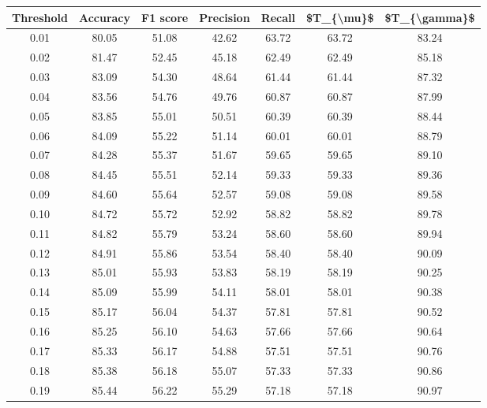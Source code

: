 \begin{tabular}{|c|c|c|c|c|c|c|}
\hline
 Threshold &  Accuracy &  F1 score &  Precision &  Recall &  \$T\_\{\textbackslash mu\}\$ &  \$T\_\{\textbackslash gamma\}\$ \\
\hline
      0.01 &     80.05 &     51.08 &      42.62 &   63.72 &      63.72 &         83.24 \\
      0.02 &     81.47 &     52.45 &      45.18 &   62.49 &      62.49 &         85.18 \\
      0.03 &     83.09 &     54.30 &      48.64 &   61.44 &      61.44 &         87.32 \\
      0.04 &     83.56 &     54.76 &      49.76 &   60.87 &      60.87 &         87.99 \\
      0.05 &     83.85 &     55.01 &      50.51 &   60.39 &      60.39 &         88.44 \\
      0.06 &     84.09 &     55.22 &      51.14 &   60.01 &      60.01 &         88.79 \\
      0.07 &     84.28 &     55.37 &      51.67 &   59.65 &      59.65 &         89.10 \\
      0.08 &     84.45 &     55.51 &      52.14 &   59.33 &      59.33 &         89.36 \\
      0.09 &     84.60 &     55.64 &      52.57 &   59.08 &      59.08 &         89.58 \\
      0.10 &     84.72 &     55.72 &      52.92 &   58.82 &      58.82 &         89.78 \\
      0.11 &     84.82 &     55.79 &      53.24 &   58.60 &      58.60 &         89.94 \\
      0.12 &     84.91 &     55.86 &      53.54 &   58.40 &      58.40 &         90.09 \\
      0.13 &     85.01 &     55.93 &      53.83 &   58.19 &      58.19 &         90.25 \\
      0.14 &     85.09 &     55.99 &      54.11 &   58.01 &      58.01 &         90.38 \\
      0.15 &     85.17 &     56.04 &      54.37 &   57.81 &      57.81 &         90.52 \\
      0.16 &     85.25 &     56.10 &      54.63 &   57.66 &      57.66 &         90.64 \\
      0.17 &     85.33 &     56.17 &      54.88 &   57.51 &      57.51 &         90.76 \\
      0.18 &     85.38 &     56.18 &      55.07 &   57.33 &      57.33 &         90.86 \\
      0.19 &     85.44 &     56.22 &      55.29 &   57.18 &      57.18 &         90.97 \\

\end{tabular}
